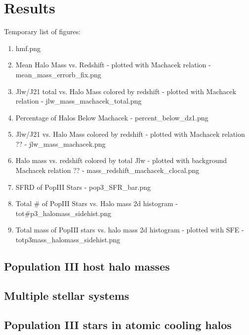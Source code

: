 \documentclass[a4paper,fleqn,usenatbib]{mnras}
\begin{document}
\section{Results}
Temporary list of figures:
\begin{enumerate}
\item hmf.png
\item Mean Halo Mass vs. Redshift - plotted with Machacek relation - mean\_mass\_errorb\_fix.png
\item Jlw/J21 total vs. Halo Mass colored by redshift - plotted with Machacek relation - jlw\_mass\_machacek\_total.png
\item Percentage of Halos Below Machacek - percent\_below\_dz1.png 
\item Jlw/J21 vs. Halo Mass colored by redshift - plotted with Machacek relation ??  - jlw\_mass\_machacek.png
\item Halo mass vs. redshift colored by total Jlw - plotted with background Machacek relation ?? - mass\_redshift\_machacek\_clocal.png
\item SFRD of PopIII Stars - pop3\_SFR\_bar.png
\item Total \# of PopIII Stars vs. Halo mass 2d histogram - tot\#p3\_halomass\_sidehist.png
\item Total mass of PopIII stars vs. halo mass 2d histogram - plotted with SFE - totp3mass\_halomass\_sidehist.png

\end{enumerate}

\subsection{Population III host halo masses}

\subsection{Multiple stellar systems}

\subsection{Population III stars in atomic cooling halos}
\end{document}
